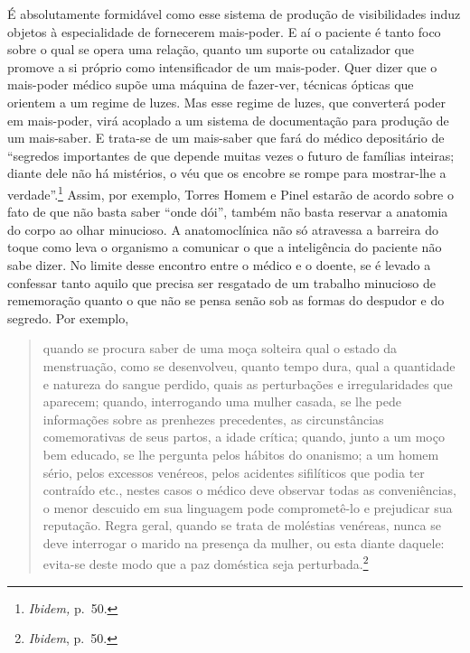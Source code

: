 É absolutamente formidável como esse sistema de produção de
visibilidades induz objetos à especialidade de fornecerem mais-poder. E
aí o paciente é tanto foco sobre o qual se opera uma relação, quanto um
suporte ou catalizador que promove a si próprio como intensificador de
um mais-poder. Quer dizer que o mais-poder médico supõe uma máquina de
fazer-ver, técnicas ópticas que orientem a um regime de luzes. Mas esse
regime de luzes, que converterá poder em mais-poder, virá acoplado a um
sistema de documentação para produção de um mais-saber. E trata-se de um
mais-saber que fará do médico depositário de ``segredos importantes de
que depende muitas vezes o futuro de famílias inteiras; diante dele não
há mistérios, o véu que os encobre se rompe para mostrar-lhe a
verdade''.\footnote{\emph{Ibidem,} p.~50.} Assim, por exemplo, Torres
Homem e Pinel estarão de acordo sobre o fato de que não basta saber
``onde dói'', também não basta reservar a anatomia do corpo ao olhar
minucioso. A anatomoclínica não só atravessa a barreira do toque como
leva o organismo a comunicar o que a inteligência do paciente não sabe
dizer. No limite desse encontro entre o médico e o doente, se é levado a
confessar tanto aquilo que precisa ser resgatado de um trabalho
minucioso de rememoração quanto o que não se pensa senão sob as formas
do despudor e do segredo. Por exemplo,

\begin{quote}
quando se procura saber de uma moça solteira qual o estado da
menstruação, como se desenvolveu, quanto tempo dura, qual a quantidade e
natureza do sangue perdido, quais as perturbações e irregularidades que
aparecem; quando, interrogando uma mulher casada, se lhe pede
informações sobre as prenhezes precedentes, as circunstâncias
comemorativas de seus partos, a idade crítica; quando, junto a um moço
bem educado, se lhe pergunta pelos hábitos do onanismo; a um homem
sério, pelos excessos venéreos, pelos acidentes sifilíticos que podia
ter contraído etc., nestes casos o médico deve observar todas as
conveniências, o menor descuido em sua linguagem pode comprometê-lo e
prejudicar sua reputação. Regra geral, quando se trata de moléstias
venéreas, nunca se deve interrogar o marido na presença da mulher, ou
esta diante daquele: evita-se deste modo que a paz doméstica seja
perturbada.\footnote{\emph{Ibidem}, p.~50.}
\end{quote}

